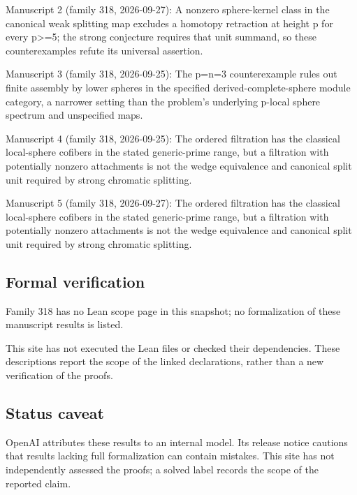 \documentclass[11pt]{article}
\begin{document}
Manuscript 2 (family 318, 2026-09-27): A nonzero sphere-kernel class in the canonical weak splitting map excludes a homotopy retraction at height p for every p>=5; the strong conjecture requires that unit summand, so these counterexamples refute its universal assertion.

Manuscript 3 (family 318, 2026-09-25): The p=n=3 counterexample rules out finite assembly by lower spheres in the specified derived-complete-sphere module category, a narrower setting than the problem’s underlying p-local sphere spectrum and unspecified maps.

Manuscript 4 (family 318, 2026-09-25): The ordered filtration has the classical local-sphere cofibers in the stated generic-prime range, but a filtration with potentially nonzero attachments is not the wedge equivalence and canonical split unit required by strong chromatic splitting.

Manuscript 5 (family 318, 2026-09-27): The ordered filtration has the classical local-sphere cofibers in the stated generic-prime range, but a filtration with potentially nonzero attachments is not the wedge equivalence and canonical split unit required by strong chromatic splitting.

\subsection{Formal verification}
Family 318 has no Lean scope page in this snapshot; no formalization of these manuscript results is listed.

This site has not executed the Lean files or checked their dependencies. These descriptions report the scope of the linked declarations, rather than a new verification of the proofs.

\subsection{Status caveat}
OpenAI attributes these results to an internal model. Its release notice cautions that results lacking full formalization can contain mistakes. This site has not independently assessed the proofs; a solved label records the scope of the reported claim.
\end{document}
